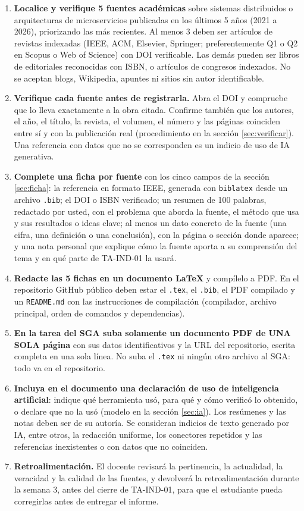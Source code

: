 \documentclass[11pt,a4paper]{article}
\begin{document}
\begin{enumerate}[label=\textbf{\arabic*.},leftmargin=1.6em]
	\item \textbf{Localice y verifique 5 fuentes académicas} sobre sistemas distribuidos o arquitecturas de microservicios publicadas en los últimos 5 años (2021 a 2026), priorizando las más recientes. Al menos 3 deben ser artículos de revistas indexadas (IEEE, ACM, Elsevier, Springer; preferentemente Q1 o Q2 en Scopus o Web of Science) con DOI verificable. Las demás pueden ser libros de editoriales reconocidas con ISBN, o artículos de congresos indexados. No se aceptan blogs, Wikipedia, apuntes ni sitios sin autor identificable.
	\item \textbf{Verifique cada fuente antes de registrarla.} Abra el DOI y compruebe que lo lleva exactamente a la obra citada. Confirme también que los autores, el año, el título, la revista, el volumen, el número y las páginas coinciden entre sí y con la publicación real (procedimiento en la sección \ref{sec:verificar}). Una referencia con datos que no se corresponden es un indicio de uso de IA generativa.
	\item \textbf{Complete una ficha por fuente} con los cinco campos de la sección \ref{sec:ficha}: la referencia en formato IEEE, generada con \texttt{biblatex} desde un archivo \texttt{.bib}; el DOI o ISBN verificado; un resumen de 100 palabras, redactado por usted, con el problema que aborda la fuente, el método que usa y sus resultados o ideas clave; al menos un dato concreto de la fuente (una cifra, una definición o una conclusión), con la página o sección donde aparece; y una nota personal que explique cómo la fuente aporta a su comprensión del tema y en qué parte de TA-IND-01 la usará.
	\item \textbf{Redacte las 5 fichas en un documento \LaTeX{}} y compílelo a PDF. En el repositorio GitHub público deben estar el \texttt{.tex}, el \texttt{.bib}, el PDF compilado y un \texttt{README.md} con las instrucciones de compilación (compilador, archivo principal, orden de comandos y dependencias).
	\item \textbf{En la tarea del SGA suba solamente un documento PDF de UNA SOLA página} con sus datos identificativos y la URL del repositorio, escrita completa en una sola línea. No suba el \texttt{.tex} ni ningún otro archivo al SGA: todo va en el repositorio.
	\item \textbf{Incluya en el documento una declaración de uso de inteligencia artificial}: indique qué herramienta usó, para qué y cómo verificó lo obtenido, o declare que no la usó (modelo en la sección \ref{sec:ia}). Los resúmenes y las notas deben ser de su autoría. Se consideran indicios de texto generado por IA, entre otros, la redacción uniforme, los conectores repetidos y las referencias inexistentes o con datos que no coinciden.
	\item \textbf{Retroalimentación.} El docente revisará la pertinencia, la actualidad, la veracidad y la calidad de las fuentes, y devolverá la retroalimentación durante la semana 3, antes del cierre de TA-IND-01, para que el estudiante pueda corregirlas antes de entregar el informe.
\end{enumerate}
\end{document}
